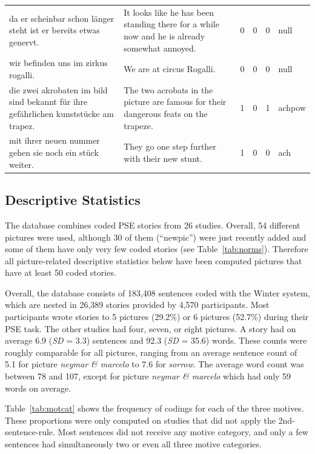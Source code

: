 \documentclass[man,a4paper,mask]{apa6}\usepackage[]{graphicx}\usepackage[]{color}
\begin{document}
\begin{table}
\begin{tabularx}{\textwidth}{XXrrrl}
  da er scheinbar schon länger steht ist er bereits etwas genervt. & It looks like he has been standing there for a while now and he is already somewhat annoyed. &   0 &   0 &   0 & null \\ 
  wir befinden uns im zirkus rogalli. & We are at circus Rogalli. &   0 &   0 &   0 & null \\ 
  die zwei akrobaten im bild sind bekannt für ihre gefährlichen kunststücke am trapez. & The two acrobats in the picture are famous for their dangerous feats on the trapeze. &   1 &   0 &   1 & achpow \\ 
  mit ihrer neuen nummer gehen sie noch ein stück weiter. & They go one step further with their new stunt. &   1 &   0 &   0 & ach \\ 
   \hline

		\bottomrule
		\end{tabularx}
\end{table}

\subsection{Descriptive Statistics}

The database combines coded PSE stories from 26 studies. Overall, 54 different pictures were used, although 30 of them (``newpic'') were just recently added and some of them have only very few coded stories (see Table~\ref{tab:norms}). Therefore all picture-related descriptive statistics below have been computed pictures that have at least 50 coded stories.

Overall, the database consists of 183,408 sentences coded with the Winter system, which are nested in 26,389 stories provided by 4,570 participants. Most participants wrote stories to 5 pictures (29.2\%) or 6 pictures (52.7\%) during their PSE task. The other studies had four, seven, or eight pictures. A story had on average 6.9 (\emph{SD} = 3.3) sentences and 92.3 (\emph{SD} = 35.6) words. These counts were roughly comparable for all pictures, ranging from an average sentence count of 5.1 for picture \emph{neymar \& marcelo} to 7.6 for \emph{sorrow}. The average word count was between 78 and 107, except for picture \emph{neymar \& marcelo} which had only 59 words on average.


Table~\ref{tab:motcat} shows the frequency of codings for each of the three motives. These proportions were only computed on studies that did not apply the 2nd-sentence-rule. Most sentences did not receive any motive category, and only a few sentences had simultaneously two or even all three motive categories.
\end{document}
